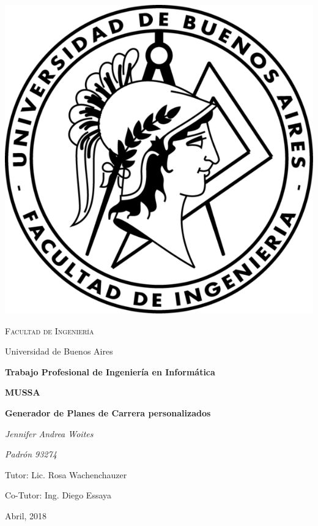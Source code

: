 \documentclass[a4paper]{article}
\begin{document}

\begin{titlepage}
	\centering
	\includegraphics{Imagenes/logo_fiuba.png}\par\vspace{1cm}
	{\scshape\LARGE Facultad de Ingeniería \par
	Universidad de Buenos Aires  \par}
	\vspace{1.5cm}
	{\Large\bfseries Trabajo Profesional de Ingeniería en Informática\par}
	\vspace{1.5cm}
	{\huge\bfseries MUSSA \par}
	\vspace{0.5cm}
	{\huge\bfseries Generador de Planes de Carrera personalizados\par}
	\vspace{1cm}
	{\Large\itshape Jennifer Andrea Woites\par}
	{\Large\itshape Padrón 93274\par}
	\vfill
	{\Large
	Tutor: Lic. Rosa Wachenchauzer \par
	\vspace{0.3cm}
	Co-Tutor: Ing. Diego Essaya}
	\vfill
	{\large Abril, 2018 \par}
\end{titlepage}
\end{document}
